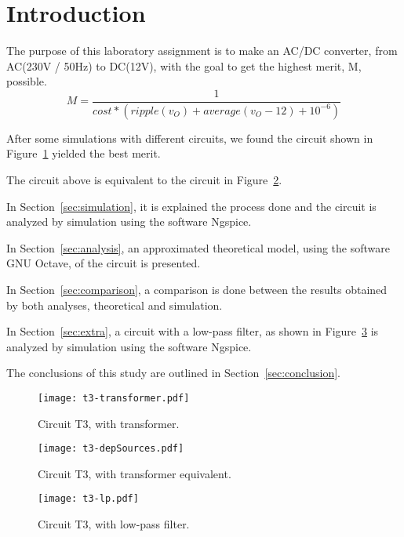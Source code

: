 \section{Introduction}
\label{sec:introduction}

The purpose of this laboratory assignment is to make an AC/DC converter, from AC(230V / 50Hz) to DC(12V), with the goal to get the highest merit, M, possible.
$$ M = \frac{1}{cost*(ripple(v_O)+average(v_O-12)+10^{-6})}$$

After some simulations with different circuits, we found the circuit shown in Figure~\ref{fig:t3-transformer} yielded the best merit.

The circuit above is equivalent to the circuit in Figure~\ref{fig:t3-depSources}.

In Section~\ref{sec:simulation}, it is explained the process done and the circuit is analyzed by
simulation using the software Ngspice. 


In Section~\ref{sec:analysis}, an approximated theoretical model, using the software GNU Octave, of the circuit is presented. 

In Section~\ref{sec:comparison}, a comparison is done between the results obtained by both analyses, theoretical and simulation.

In Section~\ref{sec:extra},  a circuit with a low-pass filter, as shown in Figure~\ref{fig:t3-lp} is analyzed by
simulation using the software Ngspice. 

The conclusions of this study are outlined in
Section~\ref{sec:conclusion}.


\begin{figure}[ht!]
\centering
    \texttt{[image: t3-transformer.pdf]}
\caption{Circuit T3, with transformer.}
\label{fig:t3-transformer}
\end{figure}

\begin{figure}[ht!]
\centering
    \texttt{[image: t3-depSources.pdf]}
\caption{Circuit T3, with transformer equivalent.}
\label{fig:t3-depSources}
\end{figure}

\begin{figure}[ht!]
\centering
    \texttt{[image: t3-lp.pdf]}
\caption{Circuit T3, with low-pass filter.}
\label{fig:t3-lp}
\end{figure}

\FloatBarrier
\clearpage
